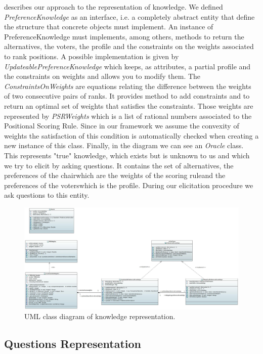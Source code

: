  describes our approach to the representation of knowledge. We defined \textit{PreferenceKnowledge} as an interface, i.e. a completely abstract entity that define the structure that concrete objects must implement. An instance of PreferenceKnowledge must implements, among others, methods to return the alternatives, the voters, the profile and the constraints on the weights associated to rank positions.
A possible implementation is given by \textit{UpdateablePreferenceKnowledge} which keeps, as attributes, a partial profile and the constraints on weights and allows you to modify them. The \textit{ConstraintsOnWeights} are equations relating the difference between the weights of two consecutive pairs of ranks. It provides method to add constraints and to return an optimal set of weights that satisfies the constraints. Those weights are represented by \textit{PSRWeights} which is a list of rational numbers associated to the Positional Scoring Rule. Since in our framework we assume the convexity of weights the satisfaction of this condition is automatically checked when creating a new instance of this class.
Finally, in the diagram we can see an \textit{Oracle} class. This represents "true" knowledge, which exists but is unknown to us and which we try to elicit by asking questions. It contains the set of alternatives, the preferences of the chair\textemdash which are the weights of the scoring rule\textemdash and the preferences of the voters\textemdash which is the profile. During our elicitation procedure we ask questions to this entity.

\begin{figure}
	\centering
	\includegraphics[width=\textwidth]{uml/knowledge.jpeg}
	\caption{UML class diagram of knowledge representation.}
	\label{uml:knowledge}
\end{figure}

\subsection{Questions Representation}

